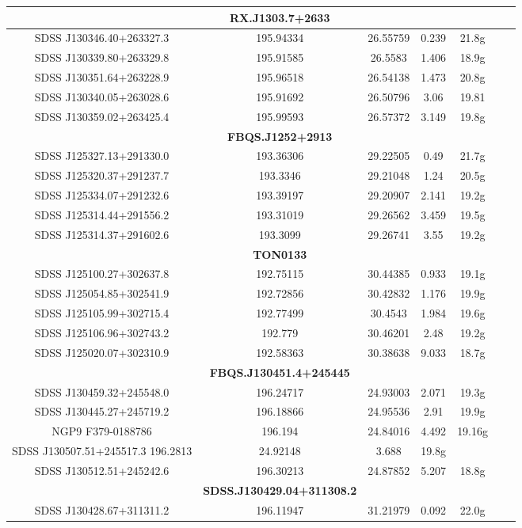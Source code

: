\begin{table}
\begin{tabular}{ c c c c c c c }
\hline
& \textbf{RX.J1303.7+2633} &&&\\
\hline
SDSS J130346.40+263327.3 & 195.94334 & 26.55759 & 0.239 & 21.8g\\
SDSS J130339.80+263329.8 & 195.91585 & 26.5583 & 1.406 & 18.9g\\
SDSS J130351.64+263228.9 & 195.96518 & 26.54138  & 1.473 & 20.8g\\
SDSS J130340.05+263028.6 & 195.91692 & 26.50796  & 3.06 & 19.81\\
SDSS J130359.02+263425.4 & 195.99593 & 26.57372  & 3.149 & 19.8g\\
\hline
& \textbf{FBQS.J1252+2913} &&&\\
\hline
SDSS J125327.13+291330.0 & 193.36306 & 29.22505  & 0.49 & 21.7g\\
SDSS J125320.37+291237.7 & 193.3346 & 29.21048  & 1.24 & 20.5g\\
SDSS J125334.07+291232.6 & 193.39197 & 29.20907 & 2.141 & 19.2g\\
SDSS J125314.44+291556.2 & 193.31019 & 29.26562 & 3.459 & 19.5g\\
SDSS J125314.37+291602.6 & 193.3099 & 29.26741 & 3.55 & 19.2g\\
\hline
& \textbf{TON0133} &&&\\
\hline
SDSS J125100.27+302637.8 & 192.75115 & 30.44385 & 0.933 & 19.1g\\
SDSS J125054.85+302541.9 & 192.72856 & 30.42832 & 1.176 & 19.9g\\
SDSS J125105.99+302715.4 & 192.77499 & 30.4543 & 1.984 & 19.6g\\
SDSS J125106.96+302743.2 & 192.779 & 30.46201 & 2.48 & 19.2g\\
SDSS J125020.07+302310.9 & 192.58363 & 30.38638 & 9.033 & 18.7g\\
\hline
& \textbf{FBQS.J130451.4+245445} &&&\\
\hline
SDSS J130459.32+245548.0 & 196.24717 & 24.93003 & 2.071 & 19.3g\\
SDSS J130445.27+245719.2 & 196.18866 & 24.95536 & 2.91 & 19.9g\\
NGP9 F379-0188786 & 196.194 & 24.84016 & 4.492 & 19.16g\\
SDSS J130507.51+245517.3 196.2813 & 24.92148 & 3.688 & 19.8g\\
SDSS J130512.51+245242.6 & 196.30213 & 24.87852 & 5.207 & 18.8g\\
\hline
& \textbf{SDSS.J130429.04+311308.2} &&&\\
\hline
SDSS J130428.67+311311.2 & 196.11947 & 31.21979 & 0.092 & 22.0g\\

\end{tabular}
\end{table}
